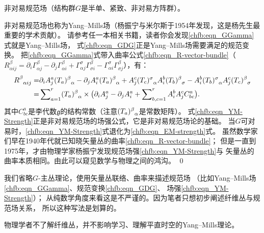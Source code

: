 \begin{example}
	非对易规范场（结构群$G$是半单、紧致、非对易方阵群）。
\end{example}
非对易规范场也称为Yang--Mills场（杨振宁与米尔斯于1954年发现，这是杨先生最重要的学术贡献）。
请参考任一本相关书籍，读者你会发现\eqref{chfb:eqn_GGamma}式就是Yang--Mills场，
式\eqref{chfb:eqn_GDG}正是Yang--Mills场需要满足的规范变换。
把\eqref{chfb:eqn_GGamma}式带入曲率公式\eqref{chfb:eqn_R-vector-bundle}（$R_{\alpha i j}^\beta 
= {\partial_i} \Gamma_{\alpha j}^{\beta} -\partial_j \Gamma_{\alpha i}^{\beta}
+\Gamma_{\alpha j}^{\sigma} \Gamma_{\sigma i}^{\beta} 
-  \Gamma_{\alpha i}^{\sigma}\Gamma_{\sigma j}^{\beta}$），有：
\begin{align}
	R_{\hphantom{\alpha}\alpha i j}^\beta 
	=&{\partial_i} A^a_j (T_a)_{\hphantom{\alpha}\alpha}^\beta 
	-\partial_j A^a_i (T_a)_{\hphantom{\alpha}\alpha}^\beta 
	+A^c_j (T_c)_{\hphantom{\alpha}\alpha}^\sigma  A^b_i (T_b)_{\hphantom{\alpha}\sigma}^\beta
	-A^b_i (T_b)_{\hphantom{\alpha}\alpha}^\sigma  A^c_j (T_c)_{\hphantom{\alpha}\sigma}^\beta \notag\\
	=& \sum\nolimits_{a=1}^{r}(T_a)_{\hphantom{\alpha}\alpha}^\beta  \times \bigl(
	{\partial_i} A^a_j  -\partial_j A^a_i  + \sum\nolimits_{b,c=1}^{r} A^b_i A^c_j C_{bc}^a    \bigr) .
	\label{chfb:eqn_YM-Strength}
\end{align}
其中$C_{bc}^a$是李代数$\mathfrak{g}$的结构常数（注意$(T_a)_{\hphantom{\alpha}\alpha}^\beta $是常数矩阵）。
式\eqref{chfb:eqn_YM-Strength}正是非对易规范场的场强公式，它是非对易规范场论的基础。
当$G$可对易时，\eqref{chfb:eqn_YM-Strength}式退化为\eqref{chfb:eqn_EM-strength}式。
虽然数学家们早在1940年代就已知晓矢量丛的曲率\eqref{chfb:eqn_R-vector-bundle}；
但是一直到1975年，才由物理学家杨振宁发现规范场强\eqref{chfb:eqn_YM-Strength}与
矢量丛的曲率本质相同。由此可以窥见数学与物理之间的鸿沟。
\qed


\begin{remark}
	我们{\kaishu 省略$G$-主丛理论}，使用矢量丛联络、曲率来描述规范场
	（比如Yang--Mills场\eqref{chfb:eqn_GGamma}、规范变换\eqref{chfb:eqn_GDG}、
	场强\eqref{chfb:eqn_YM-Strength}）；
	从纯数学角度来看这是不严谨的。因为笔者只想初步阐述纤维丛与规范场关系，
	所以这种写法是划算的。
\end{remark}

\begin{remark}\label{chfb:rem_qft}
	物理学者不了解纤维丛，并不影响学习、理解平直时空的Yang--Mills理论。
\end{remark}






%
